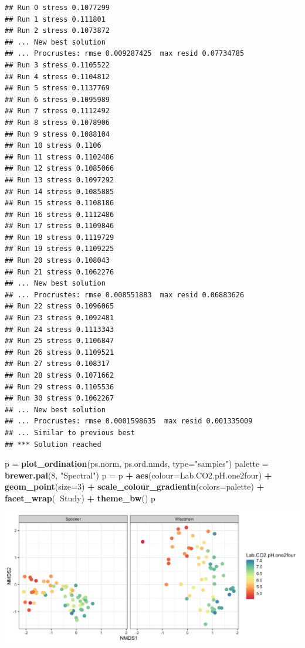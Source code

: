 \documentclass[]{article}
\newenvironment{Shaded}{\begin{snugshade}}{\end{snugshade}}
\newcommand{\DataTypeTok}[1]{\textcolor[rgb]{0.13,0.29,0.53}{#1}}
\newcommand{\DecValTok}[1]{\textcolor[rgb]{0.00,0.00,0.81}{#1}}
\newcommand{\KeywordTok}[1]{\textcolor[rgb]{0.13,0.29,0.53}{\textbf{#1}}}
\newcommand{\NormalTok}[1]{#1}
\newcommand{\OperatorTok}[1]{\textcolor[rgb]{0.81,0.36,0.00}{\textbf{#1}}}
\newcommand{\StringTok}[1]{\textcolor[rgb]{0.31,0.60,0.02}{#1}}
\begin{document}
\begin{verbatim}
## Run 0 stress 0.1077299 
## Run 1 stress 0.111801 
## Run 2 stress 0.1073872 
## ... New best solution
## ... Procrustes: rmse 0.009287425  max resid 0.07734785 
## Run 3 stress 0.1105522 
## Run 4 stress 0.1104812 
## Run 5 stress 0.1137769 
## Run 6 stress 0.1095989 
## Run 7 stress 0.1112492 
## Run 8 stress 0.1078906 
## Run 9 stress 0.1088104 
## Run 10 stress 0.1106 
## Run 11 stress 0.1102486 
## Run 12 stress 0.1085066 
## Run 13 stress 0.1097292 
## Run 14 stress 0.1085885 
## Run 15 stress 0.1108186 
## Run 16 stress 0.1112486 
## Run 17 stress 0.1109846 
## Run 18 stress 0.1119729 
## Run 19 stress 0.1109225 
## Run 20 stress 0.108043 
## Run 21 stress 0.1062276 
## ... New best solution
## ... Procrustes: rmse 0.008551883  max resid 0.06883626 
## Run 22 stress 0.1096065 
## Run 23 stress 0.1092481 
## Run 24 stress 0.1113343 
## Run 25 stress 0.1106847 
## Run 26 stress 0.1109521 
## Run 27 stress 0.108317 
## Run 28 stress 0.1071662 
## Run 29 stress 0.1105536 
## Run 30 stress 0.1062267 
## ... New best solution
## ... Procrustes: rmse 0.0001598635  max resid 0.001335009 
## ... Similar to previous best
## *** Solution reached
\end{verbatim}

\begin{Shaded}
\begin{Highlighting}[]
\NormalTok{p =}\StringTok{ }\KeywordTok{plot_ordination}\NormalTok{(ps.norm, ps.ord.nmds, }\DataTypeTok{type=}\StringTok{"samples"}\NormalTok{)}
\NormalTok{palette =}\StringTok{ }\KeywordTok{brewer.pal}\NormalTok{(}\DecValTok{8}\NormalTok{, }\StringTok{"Spectral"}\NormalTok{)}
\NormalTok{p =}\StringTok{ }\NormalTok{p }\OperatorTok{+}\StringTok{ }\KeywordTok{aes}\NormalTok{(}\DataTypeTok{colour=}\NormalTok{Lab.CO2.pH.one2four) }\OperatorTok{+}\StringTok{ }\KeywordTok{geom_point}\NormalTok{(}\DataTypeTok{size=}\DecValTok{3}\NormalTok{) }\OperatorTok{+}\StringTok{ }
\StringTok{  }\KeywordTok{scale_colour_gradientn}\NormalTok{(}\DataTypeTok{colors=}\NormalTok{palette) }\OperatorTok{+}\StringTok{ }\KeywordTok{facet_wrap}\NormalTok{(}\OperatorTok{~}\NormalTok{Study) }\OperatorTok{+}\StringTok{ }
\StringTok{  }\KeywordTok{theme_bw}\NormalTok{()}
\NormalTok{p}
\end{Highlighting}
\end{Shaded}

\includegraphics{output-rmd/nmds-bray-soilph-Lab.CO2.pH.one2four-1.png}
\end{document}
